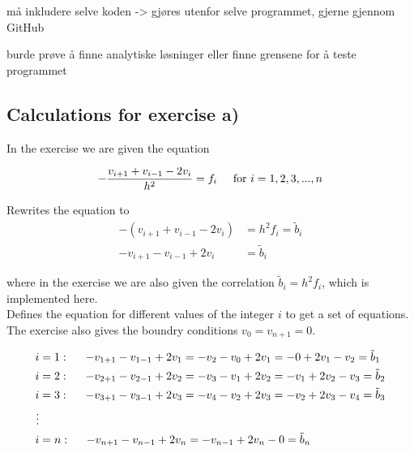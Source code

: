 \documentclass{article}
\begin{document}
  må inkludere selve koden -> gjøres utenfor selve programmet, gjerne gjennom GitHub

  burde prøve å finne analytiske løsninger eller finne grensene for å teste programmet

  \subsection{Calculations for exercise a)}

    In the exercise we are given the equation

    \begin{equation*}
      - \frac{v_{i+1} + v_{i-1} - 2 v_i}{h^2} = f_i \hspace{5mm} \textrm{for} ~  i = 1, 2, 3, ... , n
    \end{equation*}

    Rewrites the equation to
    \begin{align*}
      - (v_{i+1} + v_{i-1} - 2 v_i) &= h^2 f_i = \tilde{b}_i \\
      - v_{i+1} - v_{i-1} + 2 v_i &= \tilde{b}_i
    \end{align*}

    where in the exercise we are also given the correlation $\tilde{b}_i = h^2 f_i$, which is implemented here. \\

    Defines the equation for different values of the integer $i$ to get a set of equations. The exercise also gives the boundry conditions $v_0 = v_{n+1} = 0$.

    \begin{align*}
      i &= 1 : \hspace{5mm} - v_{1+1} - v_{1-1} + 2 v_1 = - v_2 - v_0 + 2 v_1 = - 0 + 2 v_1 - v_2 = \tilde{b}_1 \\
      i &= 2 : \hspace{5mm} - v_{2+1} - v_{2-1} + 2 v_2 = - v_3 - v_1 + 2 v_2 = - v_1 + 2 v_2 - v_3 = \tilde{b}_2 \\
      i &= 3 : \hspace{5mm} - v_{3+1} - v_{3-1} + 2 v_3 = - v_4 - v_2 + 2 v_3 = - v_2 + 2 v_3 - v_4 = \tilde{b}_3 \\
      \vdots \\
      i &= n : \hspace{5mm} - v_{n+1} - v_{n-1} + 2 v_n = - v_{n-1} + 2 v_n - 0 = \tilde{b}_n \\
    \end{align*}
\end{document}
